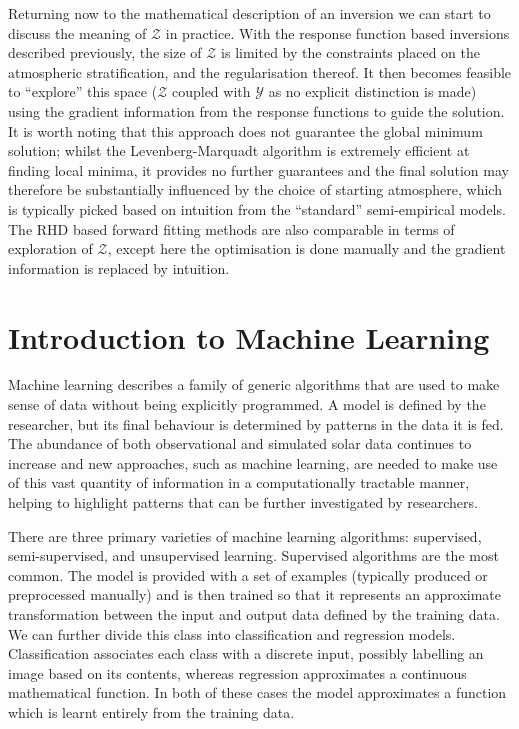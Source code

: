 Returning now to the mathematical description of an inversion we can start to discuss the meaning of $\mathcal{Z}$ in practice.
With the response function based inversions described previously, the size of $\mathcal{Z}$ is limited by the constraints placed on the atmospheric stratification, and the regularisation thereof.
It then becomes feasible to ``explore'' this space ($\mathcal{Z}$ coupled with $\mathcal{Y}$ as no explicit distinction is made) using the gradient information from the response functions to guide the solution.
It is worth noting that this approach does not guarantee the global minimum solution; whilst the Levenberg-Marquadt algorithm is extremely efficient at finding local minima, it provides no further guarantees and the final solution may therefore be substantially influenced by the choice of starting atmosphere, which is typically picked based on intuition from the ``standard'' semi-empirical models.
The RHD based forward fitting methods are also comparable in terms of exploration of $\mathcal{Z}$, except here the optimisation is done manually and the gradient information is replaced by intuition.


\section{Introduction to Machine Learning}

Machine learning describes a family of generic algorithms that are used to make sense of data without being explicitly programmed.
A model is defined by the researcher, but its final behaviour is determined by patterns in the data it is fed.
The abundance of both observational and simulated solar data continues to increase and new approaches, such as machine learning, are needed to make use of this vast quantity of information in a computationally tractable manner, helping to highlight patterns that can be further investigated by researchers.

There are three primary varieties of machine learning algorithms: supervised, semi-supervised, and unsupervised learning.
Supervised algorithms are the most common.
The model is provided with a set of examples (typically produced or preprocessed manually) and is then trained so that it represents an approximate transformation between the input and output data defined by the training data.
We can further divide this class into classification and regression models.
Classification associates each class with a discrete input, possibly labelling an image based on its contents, whereas regression approximates a continuous mathematical function.
In both of these cases the model approximates a function which is learnt entirely from the training data.

